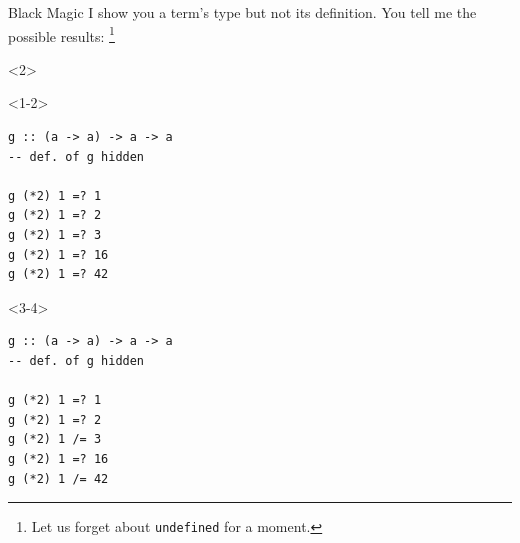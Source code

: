 \documentclass{beamer}
\begin{document}
\begin{frame}[fragile]{Black Magic}
I show you a term's type but not its definition.
You tell me the possible results:
\footnote{Let us forget about \texttt{undefined} for a moment.}







\begin{uncoverenv}<2>
\begin{onlyenv}<1-2>
\begin{verbatim}
g :: (a -> a) -> a -> a
-- def. of g hidden

g (*2) 1 =? 1
g (*2) 1 =? 2
g (*2) 1 =? 3
g (*2) 1 =? 16
g (*2) 1 =? 42
\end{verbatim}
\end{onlyenv}
\end{uncoverenv}

\begin{onlyenv}<3-4>
\begin{verbatim}
g :: (a -> a) -> a -> a
-- def. of g hidden

g (*2) 1 =? 1
g (*2) 1 =? 2
g (*2) 1 /= 3
g (*2) 1 =? 16
g (*2) 1 /= 42
\end{verbatim}
\end{onlyenv}


\end{frame}
\end{document}

